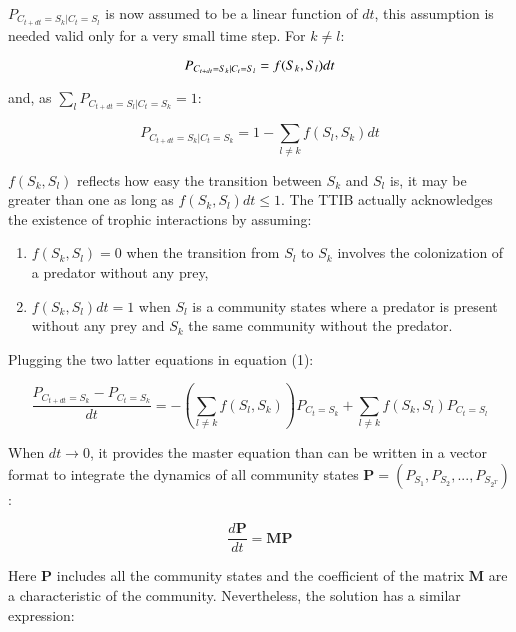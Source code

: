 \(P_{C_{t+dt}=S_k|C_{t}=S_l}\) is now assumed to be a linear function
of \(dt\), this assumption is needed valid only for a very small time
step. For \(k \neq l\):

\begin{equation}
P_{C_{t+dt}=S_k|C_{t}=S_l} = f(S_k,S_l)dt \\
\end{equation}

and, as \(\sum_l P_{C_{t+dt}=S_l|C_{t}=S_k} = 1\):

\begin{equation}
P_{C_{t+dt}=S_k|C_{t}=S_k} = 1-\sum_{l \neq k}f(S_l,S_k)dt
\end{equation}

\(f(S_k,S_l)\) reflects how easy the transition between \(S_k\) and
\(S_l\) is, it may be greater than one as long as
\(f(S_k,S_l)dt\leqslant1\). The TTIB actually acknowledges the existence
of trophic interactions by assuming:

\begin{enumerate}
\def\labelenumi{\arabic{enumi}.}
\tightlist
\item
  \(f(S_k,S_l)=0\) when the transition from \(S_l\) to \(S_k\) involves
  the colonization of a predator without any prey,
\item
  \(f(S_k,S_l)dt=1\) when \(S_l\) is a community states where a predator
  is present without any prey and \(S_k\) the same community without the
  predator.
\end{enumerate}

Plugging the two latter equations in equation (1):

\begin{equation}
\frac{P_{C_{t+dt}=S_{k}}-P_{C_{t}=S_{k}}}{dt} = -\left(\sum_{l \neq k}f(S_l,S_k)\right)P_{C_{t}=S_{k}} + \sum_{l \neq k}f(S_k,S_l)P_{C_{t}=S_{l}}
\end{equation}

When \(dt \rightarrow 0\), it provides the master equation than can be
written in a vector format to integrate the dynamics of all community
states \(\mathbf{P}=(P_{S_1}, P_{S_2}, ..., P_{S_{2^T}})\):

\begin{equation}
\frac{d\mathbf{P}}{dt} = \mathbf{M}\mathbf{P}
\end{equation}

Here \(\mathbf{P}\) includes all the community states and the coefficient of the matrix
\(\mathbf{M}\) are a characteristic of the community. Nevertheless, the solution has a
similar expression:

